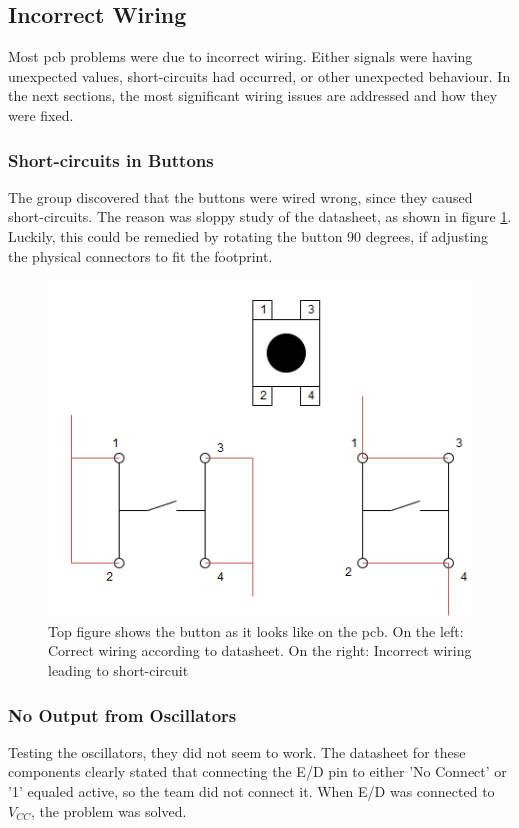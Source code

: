 \subsection{Incorrect Wiring}
Most \gls{pcb} problems were due to incorrect wiring.
Either signals were having unexpected values, short-circuits had occurred, or other unexpected behaviour.
In the next sections, the most significant wiring issues are addressed and how they were fixed.

\subsubsection{Short-circuits in Buttons}
The group discovered that the buttons were wired wrong, since they caused short-circuits.
The reason was sloppy study of the datasheet, as shown in figure \ref{fig:Button Issue}.
Luckily, this could be remedied by rotating the button 90 degrees, if adjusting the physical connectors to fit the footprint.

\begin{figure}[h!]
\centering
\includegraphics[scale=0.5]{images/Button_Issue.png}
\caption{Top figure shows the button as it looks like on the \gls{pcb}. On the left: Correct wiring according to datasheet. On the right: Incorrect wiring leading to short-circuit}
\label{fig:Button Issue}
\end{figure}

\subsubsection{No Output from Oscillators}
Testing the oscillators, they did not seem to work.
The datasheet for these components clearly stated that connecting the E/D pin to either 'No Connect' or '1' equaled active, so the team did not connect it.
When E/D was connected to \(V_{CC}\), the problem was solved.

